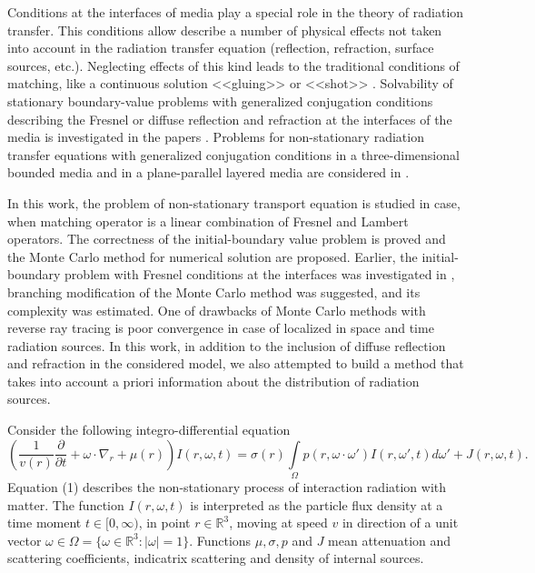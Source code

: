 \documentclass[12pt,reqno]{report}
\begin{document}
Conditions at the interfaces of media play a special role in the theory of radiation transfer. This conditions allow describe a number of physical effects not taken into account in the radiation transfer equation (reflection, refraction, surface sources, etc.). Neglecting effects of this kind leads to the traditional conditions of matching, like a continuous solution <<gluing>> or <<shot>> \cite{2.6}. Solvability of stationary boundary-value problems with generalized conjugation conditions describing the Fresnel or diffuse reflection and refraction at the interfaces of the media is investigated in the papers \cite{19,20,21,22,23,24,25,26}. Problems for non-stationary radiation transfer equations with generalized conjugation conditions in a three-dimensional bounded media and in a plane-parallel layered media are considered in \cite{27,28,29,30,31,32,33}.

In this work, the problem of non-stationary transport equation is studied in case, when matching operator is a linear combination of Fresnel and Lambert operators. The correctness of the initial-boundary value problem is proved and the Monte Carlo method for numerical solution are proposed. Earlier, the initial-boundary problem with Fresnel conditions at the interfaces was investigated in \cite{33}, branching modification of the Monte Carlo method was suggested, and its complexity was estimated. One of drawbacks of Monte Carlo methods with reverse ray tracing is poor convergence in case of localized in space and time radiation sources. In this work, in addition to the inclusion of diffuse reflection and refraction in the considered model, we also attempted to build a method that takes into account a priori information about the distribution of radiation sources.

Consider the following integro-differential equation \cite{29,30,31,32,33}
\begin{equation}
\left (\frac{1}{v(r)} \frac{\partial }{\partial t } + \omega
\cdot \nabla_r + \mu(r) \right) I(r,\omega,t)=\sigma(r)
\int\limits_{\Omega} p(r,\omega \cdot
\omega')I(r,\omega',t)d\omega' + J(r,\omega,t).
\end{equation}
Equation (1) describes the non-stationary process of interaction
radiation with matter. The function $I(r,\omega,t)$ is interpreted
as the particle flux density at a time moment $t\in [0,\infty)$,
in point $r\in \mathbb{R}^3$, moving at speed $v$ in
direction of a unit vector $\omega \in \Omega=\{\omega \in
\mathbb{R}^3: |\omega|=1\}$. Functions $\mu,\sigma, p$ and $J$ mean
attenuation and scattering coefficients,
indicatrix scattering and density of internal sources.
\end{document}
